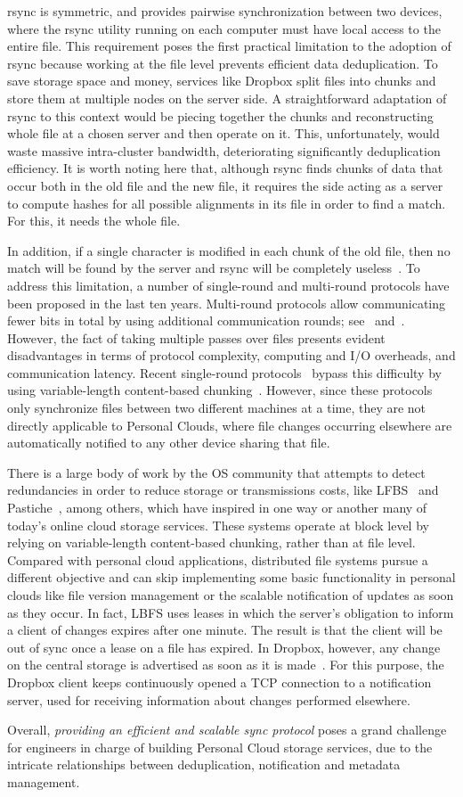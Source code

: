 rsync is symmetric, and provides pairwise synchronization between two devices, where the rsync
utility running on each computer must have local access to the entire file. This requirement
poses the first practical limitation to the adoption of rsync because working at the file level
prevents efficient data deduplication. To save storage space and money, services like Dropbox
split files into chunks and store them at multiple nodes on the server side. A straightforward
adaptation of rsync to this context would be piecing together the chunks and reconstructing
whole file at a chosen server and then operate on it. This, unfortunately, would waste massive
intra-cluster bandwidth, deteriorating significantly deduplication efficiency. It is worth
noting here that, although rsync finds chunks of data that occur both in the old file and the
new file, it requires the side acting as a server to compute hashes for all possible alignments
in its file in order to find a match. For this, it needs the whole file.  

In addition, if a single character is modified in each chunk of the old file, then no match
will be found by the server and rsync will be completely useless~\cite{langford01}. To address this limitation,
a number of single-round and multi-round protocols have been proposed in the last ten years. 
Multi-round protocols allow communicating fewer bits in total by using additional communication
rounds; see~\cite{langford01} and~\cite{suel04}. However, the fact of taking multiple passes over files presents evident
disadvantages in terms of protocol complexity, computing and I/O overheads, and communication
latency. Recent single-round protocols~\cite{irmak05}\cite{hao08} bypass this difficulty by using variable-length
content-based chunking~\cite{Muthitacharoen01}. However, since these protocols only synchronize files between two
different machines at a time, they are not directly applicable to Personal Clouds, where file
changes occurring elsewhere are automatically notified to any other device sharing that file. 

There is a large body of work by the OS community that attempts to detect redundancies in order
to reduce storage or transmissions costs, like LFBS~\cite{Muthitacharoen01} and Pastiche~\cite{Cox02}, among others, which
have inspired in one way or another many of today's online cloud storage services. These systems
operate at block level by relying on variable-length content-based chunking, rather than at
file level. Compared with personal cloud applications, distributed file systems pursue a
different objective and can skip implementing some basic functionality in personal clouds like
file version management or the scalable notification of updates as soon as they occur. In fact,
LBFS uses leases in which the server's obligation to inform a client of changes expires after one
minute. The result is that the client will be out of sync once a lease on a file has expired. 
In Dropbox, however, any change on the central storage is advertised as soon as it is made~\cite{drago2012inside}.
For this purpose, the Dropbox client keeps continuously opened a TCP connection to a notification
server, used for receiving information about changes performed elsewhere.

Overall, \textit{providing an efficient and scalable sync protocol} poses a grand challenge for
engineers in charge of building Personal Cloud storage services, due to the intricate
relationships between deduplication, notification and metadata management.